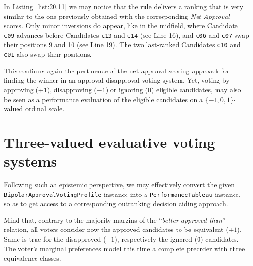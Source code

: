 In Listing~\vref{list:20.11} we may notice that the \NetFlows rule delivers a ranking that is very similar to the one previously obtained with the corresponding \emph{Net Approval} scores. Only minor inversions do appear, like in the midfield, where Candidate \texttt{c09} advances before Candidates \texttt{c13} and \texttt{c14} (see Line 16), and \texttt{c06} and \texttt{c07} swap their positions 9 and 10 (see Line 19). The two last-ranked Candidates \texttt{c10} and \texttt{c01} also swap their positions.

This confirms again the pertinence of the net approval scoring approach for finding the winner in an approval-disapproval voting system. Yet, voting by approving ($+1$), disapproving ($-1$) or ignoring ($0$) eligible candidates, may also be seen as a performance evaluation of the eligible candidates on a $\{-1, 0, 1\}$-valued ordinal scale.

\section{Three-valued evaluative voting systems}
\label{sec:20.4}

Following such an epistemic perspective, we may effectively convert the given \texttt{BipolarApprovalVotingProfile} instance into a \texttt{PerformanceTableau} instance, so as to get access to a corresponding outranking decision aiding approach.

Mind that, contrary to the majority margins of the ``\emph{better approved than}'' relation, all voters consider now the approved candidates to be equivalent ($+1$). Same is true for the disapproved ($-1$), respectively the ignored ($0$) candidates. The voter's marginal preferences model this time a complete preorder with three equivalence classes. 

